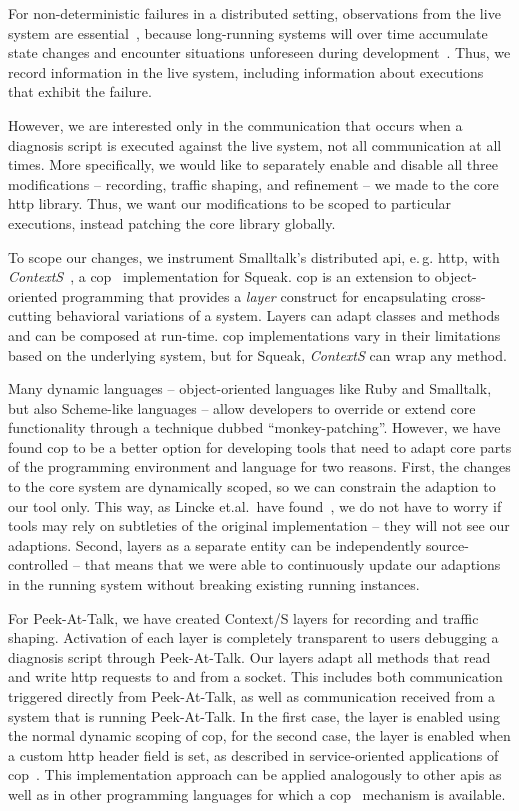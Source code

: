 \documentclass[preprint,3p]{elsarticle}
\newcommand{\ac}[1]{\gls{#1}}
\newcommand{\toolname}{Peek-At-Talk\xspace}
\begin{document}
For non-deterministic failures in a distributed setting, observations
from the live system are essential~\cite{altekar2009odr}, because
long-running systems will over time accumulate state changes and
encounter situations unforeseen during
development~\cite{Geels2006Replay}. Thus, we record information in the
live system, including information about executions that exhibit the
failure.

However, we are interested only in the communication that occurs when
a diagnosis script is executed against the live system, not all
communication at all times. More specifically, we would like to
separately enable and disable all three modifications -- recording,
traffic shaping, and refinement -- we made to the core \ac{http}
library. Thus, we want our modifications to be scoped to particular
executions, instead patching the core library globally.

To scope our changes, we instrument Smalltalk's distributed \ac{api},
e.\,g. \ac{http}, with \emph{ContextS}~\cite{Hirschfeld2008}, a
\ac{cop}~\cite{Appeltauer2009} implementation for Squeak.  \ac{cop} is an
extension to object-oriented programming that provides a \emph{layer} construct
for encapsulating cross-cutting behavioral variations of a system.  Layers can
adapt classes and methods and can be composed at run-time. \ac{cop}
implementations vary in their limitations based on the underlying system, but
for Squeak, \emph{ContextS} can wrap any method.

Many dynamic languages -- object-oriented languages like Ruby and
Smalltalk, but also Scheme-like languages -- allow developers to
override or extend core functionality through a technique dubbed
``monkey-patching''.  However, we have found \ac{cop} to be a better
option for developing tools that need to adapt core parts of the
programming environment and language for two reasons. First, the
changes to the core system are dynamically scoped, so we can constrain
the adaption to our tool only.  This way, as Lincke et.al.~have
found~\cite{lincke2012scoping}, we do not have to worry if tools may
rely on subtleties of the original implementation -- they will not see
our adaptions.  Second, layers as a separate entity can be
independently source-controlled -- that means that we were able to
continuously update our adaptions in the running system without
breaking existing running instances.

For \toolname, we have created Context/S layers for recording and
traffic shaping. Activation of each layer is completely transparent to
users debugging a diagnosis script through \toolname. Our layers adapt
all methods that read and write \ac{http} requests to and from a
socket.  This includes both communication triggered directly from
\toolname, as well as communication received from a system that is
running \toolname.  In the first case, the layer is enabled using the
normal dynamic scoping of \ac{cop}, for the second case, the layer is
enabled when a custom \ac{http} header field is set, as described in
service-oriented applications of
\ac{cop}~\cite{appeltauer2013declarative}.  This implementation
approach can be applied analogously to other \ac{api}s as well as in
other programming languages for which a \ac{cop}~\cite{Appeltauer2009}
mechanism is available.
\end{document}
